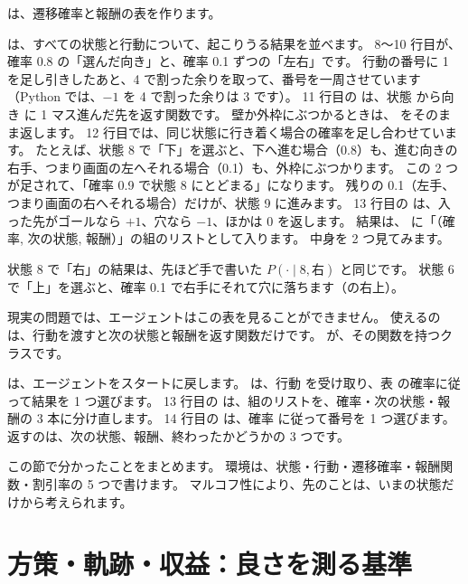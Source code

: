 は、遷移確率と報酬の表を作ります。


 は、すべての状態と行動について、起こりうる結果を並べます。
8〜10 行目が、確率 0.8 の「選んだ向き」と、確率 0.1 ずつの「左右」です。
行動の番号に 1 を足し引きしたあと、4 で割った余りを取って、番号を一周させています（Python では、$-1$ を 4 で割った余りは 3 です）。
11 行目の  は、状態  から向き  に 1 マス進んだ先を返す関数です。
壁か外枠にぶつかるときは、 をそのまま返します。
12 行目では、同じ状態に行き着く場合の確率を足し合わせています。
たとえば、状態 8 で「下」を選ぶと、下へ進む場合（0.8）も、進む向きの右手、つまり画面の左へそれる場合（0.1）も、外枠にぶつかります。
この 2 つが足されて、「確率 0.9 で状態 8 にとどまる」になります。
残りの 0.1（左手、つまり画面の右へそれる場合）だけが、状態 9 に進みます。
13 行目の  は、入った先がゴールなら $+1$、穴なら $-1$、ほかは 0 を返します。
結果は、 に「（確率, 次の状態, 報酬）」の組のリストとして入ります。
中身を 2 つ見てみます。


状態 8 で「右」の結果は、先ほど手で書いた $P(\cdot\mid 8,\text{右})$ と同じです。
状態 6 で「上」を選ぶと、確率 0.1 で右手にそれて穴に落ちます（の右上）。

現実の問題では、エージェントはこの表を見ることができません。
使えるのは、行動を渡すと次の状態と報酬を返す関数だけです。
が、その関数を持つクラスです。


 は、エージェントをスタートに戻します。
 は、行動  を受け取り、表  の確率に従って結果を 1 つ選びます。
13 行目の  は、組のリストを、確率・次の状態・報酬の 3 本に分け直します。
14 行目の  は、確率  に従って番号を 1 つ選びます。
返すのは、次の状態、報酬、終わったかどうかの 3 つです。

この節で分かったことをまとめます。
環境は、状態・行動・遷移確率・報酬関数・割引率の 5 つで書けます。
マルコフ性により、先のことは、いまの状態だけから考えられます。

\section{方策・軌跡・収益：良さを測る基準}\label{sec:rlb-return}

